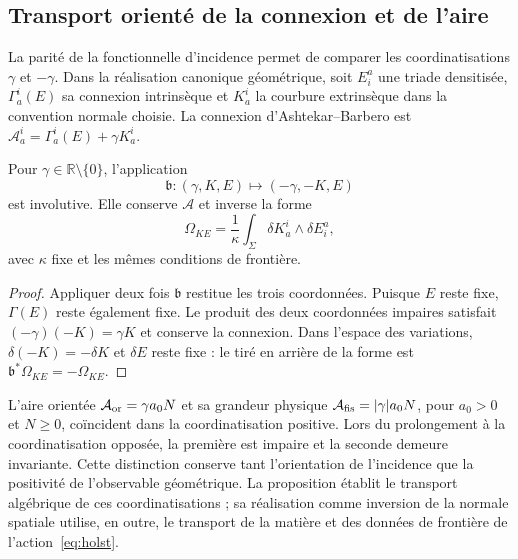 \subsection{Transport orienté de la connexion et de l'aire}
\label{sec:ii-costura-barbero}
La parité de la fonctionnelle d’incidence permet de comparer les coordinatisations
\(\gamma\) et \(-\gamma\). Dans la réalisation canonique géométrique,
soit \(E^a_i\) une triade densitisée, \(\Gamma_a^i(E)\) sa
connexion intrinsèque et \(K_a^i\) la courbure extrinsèque dans la
convention normale choisie. La connexion d’Ashtekar--Barbero est
\(\mathcal A_a^i=\Gamma_a^i(E)+\gamma K_a^i\).

\begin{proposition}
\label{prop:ii-costura-barbero}
Pour \(\gamma\in\mathbb R\setminus\{0\}\), l'application
\[
 \mathfrak b:(\gamma,K,E)\longmapsto(-\gamma,-K,E)
\]
est involutive. Elle conserve \(\mathcal A\) et inverse la forme
\[
 \Omega_{KE}=\frac1\kappa\int_\Sigma
 \delta K_a^i\wedge\delta E^a_i,
\]
avec \(\kappa\) fixe et les mêmes conditions de frontière.
\end{proposition}
\begin{proof}
Appliquer deux fois \(\mathfrak b\) restitue les trois coordonnées.
Puisque \(E\) reste fixe, \(\Gamma(E)\) reste également fixe.
Le produit des deux coordonnées impaires satisfait
\((-\gamma)(-K)=\gamma K\) et conserve la connexion.
Dans l'espace des variations, \(\delta(-K)=-\delta K\) et
\(\delta E\) reste fixe : le tiré en arrière de la forme est
\(\mathfrak b^*\Omega_{KE}=-\Omega_{KE}\).
\end{proof}

L’aire orientée \(\mathcal A_{\rm or}=\gamma a_0N\) et sa
grandeur physique \(\mathcal A_{\rm fis}=|\gamma|a_0N\), pour
\(a_0>0\) et \(N\geq0\), coïncident dans la coordinatisation positive.
Lors du prolongement à la coordinatisation opposée, la première est impaire et la seconde
demeure invariante. Cette distinction conserve tant l’orientation
de l’incidence que la positivité de l’observable géométrique.
La proposition établit le transport algébrique de ces coordinatisations ;
sa réalisation comme inversion de la normale spatiale utilise,
en outre, le transport de la matière et des données de frontière
de l’action~\eqref{eq:holst}.
